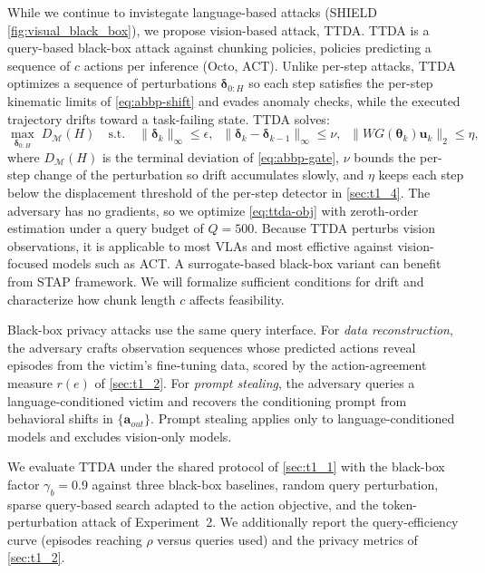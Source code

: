  While we continue to invistegate language-based attacks (\eg SHIELD \autoref{fig:visual_black_box}), we propose vision-based attack, TTDA.
TTDA is a query-based black-box attack against chunking policies, \ie policies predicting a sequence of $c$ actions per inference (\eg Octo, ACT). Unlike per-step attacks, TTDA optimizes a sequence of perturbations $\bm{\delta}_{0:H}$ so each step satisfies the per-step kinematic limits of \autoref{eq:abbp-shift} and evades anomaly checks, while the executed trajectory drifts toward a task-failing state. TTDA solves:
\begin{equation}
\max_{\bm{\delta}_{0:H}}\; D_{\mathcal{M}}(H)
\quad\text{s.t.}\quad
\|\bm{\delta}_k\|_{\infty}\le\epsilon,\;\;
\|\bm{\delta}_k-\bm{\delta}_{k-1}\|_{\infty}\le\nu,\;\;
\|W G(\bm{\theta}_k)\bm{u}_k\|_{2}\le\eta,
\label{eq:ttda-obj}
\end{equation}
where $D_{\mathcal{M}}(H)$ is the terminal deviation of \autoref{eq:abbp-gate}, $\nu$ bounds the per-step change of the perturbation so drift accumulates slowly, and $\eta$ keeps each step below the displacement threshold of the per-step detector in \autoref{sec:t1_4}. The adversary has no gradients, so we optimize \autoref{eq:ttda-obj} with zeroth-order estimation under a query budget of $Q{=}500$. Because TTDA perturbs vision observations, it is applicable to most VLAs and most effictive against vision-focused models such as ACT. 
A surrogate-based black-box variant can benefit from STAP framework. 
We will formalize sufficient conditions for drift and characterize how chunk length $c$ affects feasibility. %

 Black-box privacy attacks use the same query interface. For \emph{data reconstruction}, the adversary crafts observation sequences whose predicted actions reveal episodes from the victim's fine-tuning data, scored by the action-agreement measure $r(e)$ of \autoref{sec:t1_2}. For \emph{prompt stealing}, the adversary queries a language-conditioned victim and recovers the conditioning prompt from behavioral shifts in $\{\bm{a}_{out}\}$. Prompt stealing applies only to language-conditioned models and excludes vision-only models.


 We evaluate TTDA under the shared protocol of \autoref{sec:t1_1} with the black-box factor $\gamma_{b}{=}0.9$ against three black-box baselines, \ie random query perturbation, sparse query-based search adapted to the action objective, and the token-perturbation attack of Experiment~2. 
We additionally report the query-efficiency curve (episodes reaching $\rho$ versus queries used) and the privacy metrics of \autoref{sec:t1_2}.

